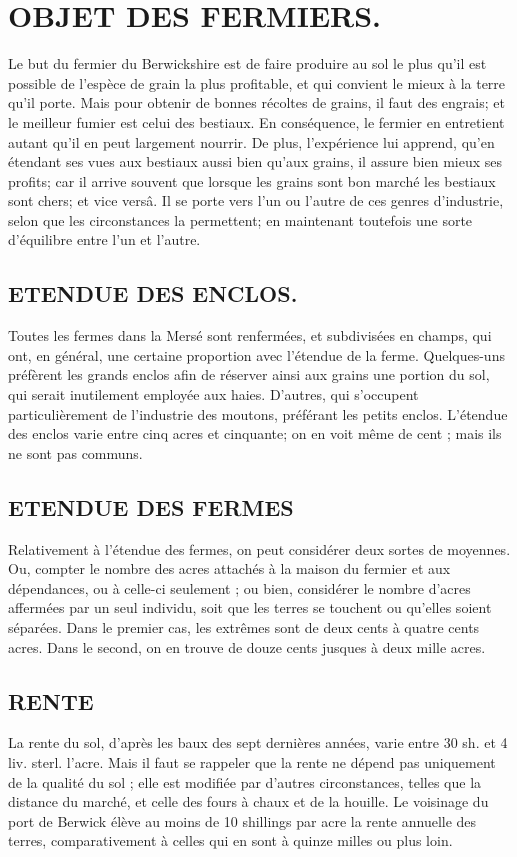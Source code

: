 \section{OBJET DES FERMIERS.}
Le but du fermier du Berwickshire est de faire produire au sol le plus qu'il est possible de l'espèce de grain la plus profitable, et qui convient le mieux à la terre qu'il porte. Mais pour obtenir de bonnes récoltes de grains, il faut des engrais; et le meilleur fumier est celui des bestiaux. En conséquence, le fermier en entretient autant qu'il en peut largement nourrir. De plus, l'expérience lui apprend, qu'en étendant ses vues aux bestiaux aussi bien qu'aux grains, il assure bien mieux ses profits; car il arrive souvent que lorsque les grains sont bon marché les bestiaux sont chers; et vice versâ. Il se porte vers l'un ou l'autre de ces genres d'industrie, selon que les circonstances la permettent; en maintenant toutefois une sorte d'équilibre entre l'un et l'autre.
\subsection{ETENDUE DES ENCLOS.}
Toutes les fermes dans la Mersé sont renfermées, et subdivisées en champs, qui ont, en général, une certaine proportion avec l'étendue de la ferme. Quelques-uns préfèrent les grands enclos afin de réserver ainsi aux grains une portion du sol, qui serait inutilement employée aux haies. D'autres, qui s'occupent particulièrement de l'industrie des moutons, préférant les petits enclos. L'étendue des enclos varie entre cinq acres et cinquante; on en\setcounter{page}{76} voit même de cent ; mais ils ne sont pas communs.
\subsection{ETENDUE DES FERMES}
Relativement à l'étendue des fermes, on peut considérer deux sortes de moyennes. Ou, compter le nombre des acres attachés à la maison du fermier et aux dépendances, ou à celle-ci seulement ; ou bien, considérer le nombre d'acres affermées par un seul individu, soit que les terres se touchent ou qu'elles soient séparées. Dans le premier cas, les extrêmes sont de deux cents à quatre cents acres. Dans le second, on en trouve de douze cents jusques à deux mille acres.
\subsection{RENTE}
La rente du sol, d'après les baux des sept dernières années, varie entre 30 sh. et 4 liv. sterl. l'acre. Mais il faut se rappeler que la rente ne dépend pas uniquement de la qualité du sol ; elle est modifiée par d'autres circonstances, telles que la distance du marché, et celle des fours à chaux et de la houille. Le voisinage du port de Berwick élève au moins de 10 shillings par acre la rente annuelle des terres, comparativement à celles qui en sont à quinze milles ou plus loin.
